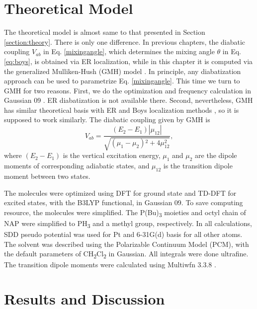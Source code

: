 \section{Theoretical Model} %
The theoretical model is almost same to that presented in Section \ref{section:theory}. There is only one difference. In previous chapters, the diabatic coupling $V_{ab}$ in Eq. \ref{mixingangle}, which determines the mixing angle $\theta$ in Eq. \ref{eq:boys}, is obtained via ER localization, while in this chapter it is computed via the generalized Mulliken-Hush (GMH) model \cite{cave1996generalization,cave1997calculation}. In principle, any diabatization approach can be used to parametrize Eq. \ref{mixingangle}. This time we turn to GMH for two reasons. First, we do the optimization and frequency calculation in Gaussian 09 \cite{g09}. ER diabatization is not available there. Second, nevertheless, GMH has similar theoretical basis with ER and Boys localization methods \cite{subotnik2008constructing,subotnik2010predicting}, so it is supposed to work similarly. The diabatic coupling given by GMH is
$$V_{ab}=\frac{\left(E_2-E_1\right) \left|\mu _{12}\right|}{\sqrt{\left(\mu _1-\mu _2\right){}^2+4 \mu _{12}^2}},$$
where $\left(E_2-E_1\right)$ is the vertical excitation energy, $\mu _1$ and $\mu _2$ are the dipole moments of corresponding adiabatic states, and $\mu _{12}$ is the transition dipole moment between two states.

The molecules were optimized using DFT for ground state and TD-DFT for excited states, with the B3LYP functional, in Gaussian 09. To save computing resource, the molecules were simplified. The P(Bu)\textsubscript{3} moieties and octyl chain of NAP were simplified to PH\textsubscript{3} and a methyl group, respectively. In all calculations, SDD pseudo potential was used for Pt and 6-31G(d) basis for all other atoms. The solvent was described using the Polarizable Continuum Model (PCM), with the default parameters of CH\textsubscript{2}Cl\textsubscript{2} in Gaussian. All integrals were done ultrafine. The transition dipole moments were calculated using Multiwfn 3.3.8 \cite{lu2012multiwfn}.




\section{Results and Discussion} %

